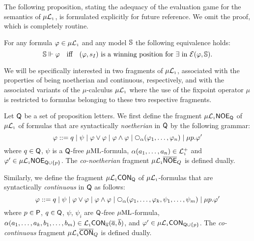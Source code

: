 The following proposition, 
stating the adequacy of the evaluation game for the semantics of $\mu\mathcal{L}_{\scriptscriptstyle 1}$,
is formulated explicitly for future reference.
We omit the proof, which is completely routine.

\begin{fact}[Adequacy]
\label{f:adeqmu}
For any formula $\varphi \in \mu\mathcal{L}_{\scriptscriptstyle 1}$ and any model $\mathbb{S}$ the following 
equivalence holds:
\[
\model \mmodels \phi
\quad\text{iff}\quad 
(\phi,s_{I}) \text{ is a winning position for $\eloise$ in } 
\egame(\varphi,\model).
\]
\end{fact}

We will be specifically interested in two fragments of $\mu\mathcal{L}_{\scriptscriptstyle 1}$, associated 
with the properties of being noetherian and continuous, respectively, and with 
the associated variants of the $\mu$-calculus $\mu\mathcal{L}_{\scriptscriptstyle 1}$ where the use of the 
fixpoint operator $\mu$ is restricted to formulas belonging to these two
respective fragments.

\begin{definition}
Let $\mathsf{Q}$ be a set  of proposition letters.
We first define the fragment $\mu\mathcal{L}_{\scriptscriptstyle 1}\mathsf{NOE}_{\mathsf{Q}}$ of $\mu\mathcal{L}_{\scriptscriptstyle 1}$ of 
formulas that are syntactically \emph{noetherian} in $\mathsf{Q}$ by the following 
grammar:
\begin{equation*}
   \varphi ::= q
   \mid \psi
   \mid \varphi \lor \varphi
   \mid \varphi \land \varphi
   \mid \nxt{\al}(\varphi_{1},\ldots,\varphi_{n})
   \mid \mu p.\phi'
\end{equation*}
where $q \in \mathsf{Q}$, $\psi$ is a $\mathsf{Q}$-free $\mu\mathrm{ML}$-formula,
$\alpha(a_{1},\ldots,a_{n}) \in \mathcal{L}_{\scriptscriptstyle 1}^{+}$ and 
$\varphi' \in \mu\mathcal{L}_{\scriptscriptstyle 1}\mathsf{NOE}_{\mathsf{Q}\cup\{p\}}$. 
The \emph{co-noetherian} fragment $\mu\mathcal{L}_{\scriptscriptstyle 1}\overline{\mathsf{NOE}}_{Q}$ is defined dually.

Similarly, we define the fragment $\mu\mathcal{L}_{\scriptscriptstyle 1}\mathsf{CON}_{\mathsf{Q}}$ of 
$\mu\mathcal{L}_{\scriptscriptstyle 1}$-formulas that are syntactically \emph{continuous} in $\mathsf{Q}$ as
follows:
\begin{equation*}
   \varphi ::= q
   \mid \psi
   \mid \varphi \lor \varphi
   \mid \varphi \land \varphi
   \mid 
   \nxt{\al}(\varphi_{1},\ldots,\varphi_{k},\psi_{1},\ldots,\psi_{m})
   \mid \mu p.\phi'
\end{equation*}
where $p\in\mathsf{P}$, $q \in \mathsf{Q}$, $\psi$, $\psi_{i}$ are $\mathsf{Q}$-free 
$\mu\mathrm{ML}$-formula, $\alpha(a_{1},\ldots,a_{k},b_{1},\ldots,b_{m}) \in 
\mathcal{L}_{\scriptscriptstyle 1}\mathsf{CON}_{\overline{a}}(\overline{a},\overline{b})$,
and $\varphi' \in \mu\mathcal{L}_{\scriptscriptstyle 1}\mathsf{CON}_{\mathsf{Q}\cup\{p\}}$. 
The \emph{co-continuous} fragment $\mu\mathcal{L}_{\scriptscriptstyle 1}\overline{\mathsf{CON}}_{Q}$ is defined dually.
\end{definition}

